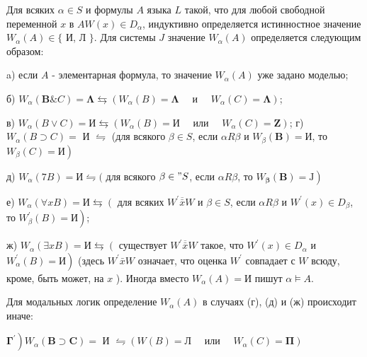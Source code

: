 \documentclass[10pt]{article}
\begin{document}
Для всяких $\alpha \in S$ и формулы $A$ языка $L$ такой, что для любой свободной переменной $x$ в $A W(x) \in D_{\alpha}$, индуктивно определяется истинностное значение $W_{\alpha}(A) \in\{$ И, Л $\}$. Для системы $J$ значение $W_{\alpha}(A)$ определяется следующим образом:



a) если $A$ - элементарная формула, то значение $W_{\alpha}(A)$ уже задано моделью;



б) $W_{\alpha}(\boldsymbol{B} \& C)=\boldsymbol{\Lambda} \leftrightarrows\left(W_{\alpha}(B)=\boldsymbol{\Lambda} \quad\right.$ и $\left.\quad W_{\alpha}(C)=\boldsymbol{\Lambda}\right)$;



в) $W_{\alpha}(B \vee C)=И \leftrightarrows\left(W_{\alpha}(B)=И \quad\right.$ или $\left.\quad W_{\alpha}(C)=\mathbf{Z}\right)$; г) $W_{\alpha}(B \supset C)=$ И $\leftrightharpoons$ (для всякого $\beta \in S$, если $\alpha R \beta$ и $W_{\beta}(\boldsymbol{B})=\mathrm{И}$, то $\left.W_{\beta}(C)=\mathrm{И}\right)$



д) $W_{\alpha}(7 B)=И \leftrightharpoons($ для всякого $\beta \in " S$, если $\alpha R \beta$, то $\left.W_{\boldsymbol{\beta}}(\boldsymbol{B})=\mathrm{J}\right)$



е) $W_{\alpha}(\forall x B)=И \leftrightarrows\left(\right.$ для всяких $W^{\prime} \overline{\bar{x}} W$ и $\beta \in S$, если $\alpha R \beta$ и $W^{\prime}(x) \in D_{\beta}$, то $\left.W_{\beta}^{\prime}(B)=И\right)$;



ж) $W_{\alpha}(\exists x B)=И \leftrightarrows\left(\right.$ существует $W^{\prime} \overline{\bar{x}} W$ такое, что $W^{\prime}(x) \in D_{\alpha}$ и $\left.W_{\alpha}^{\prime}(B)=И\right)$ (здесь $W^{\prime} \bar{x} W$ означает, что оценка $W^{\prime}$ совпадает с $W$ всюду, кроме, быть может, на $x$ ). Иногда вместо $W_{\alpha}(A)=И$ пишут $\alpha \models A$.



Для модальных логик определение $W_{\alpha}(A)$ в случаях (г), (д) и (ж) происходит иначе:



$\left.\boldsymbol{\Gamma}^{\prime}\right) W_{\alpha}(\boldsymbol{B} \supset \boldsymbol{C})=$ И $\leftrightharpoons\left(W(B)=Л \quad\right.$ или $\left.\quad W_{\alpha}(C)=\mathbf{\Pi}\right)$
\end{document}
